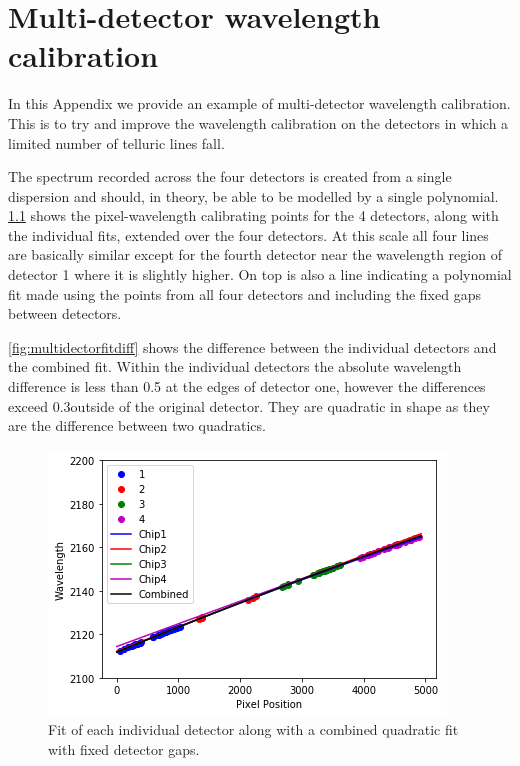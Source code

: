 
\chapter{Multi-detector wavelength calibration} %
\label{appendix:wavelength_fitting}

In this Appendix we provide an example of multi-detector wavelength calibration.
This is to try and improve the wavelength calibration on the detectors in which a limited number of telluric lines fall.

The spectrum recorded across the four detectors is created from a single dispersion and should, in theory, be able to be modelled by a single polynomial. \cref{fig:multidectorfit} shows the pixel-wavelength calibrating points for the 4 detectors, along with the individual fits, extended over the four detectors. At this scale all four lines are basically similar except for the fourth detector near  the wavelength region of detector 1 where it is slightly higher. On top is also a line indicating a polynomial fit made using the points from all four detectors and including the fixed gaps between detectors. 

\cref{fig:multidectorfitdiff} shows the difference between the individual detectors and the combined fit. Within the individual detectors the absolute wavelength difference is less than 0.5\nm{} at the edges of detector one, however the differences exceed 0.3\nm outside of the original detector. They are quadratic in shape as they are the difference between two quadratics.

\begin{figure}
    \centering
    \includegraphics[width=0.75\linewidth]{./figures/appendix/multi_detector_fit}
    \caption[Multi-detector fit and difference to individual fits.]{ Fit of each individual detector along with a combined quadratic fit with fixed detector gaps.}
    \label{fig:multidectorfit}
\end{figure}


